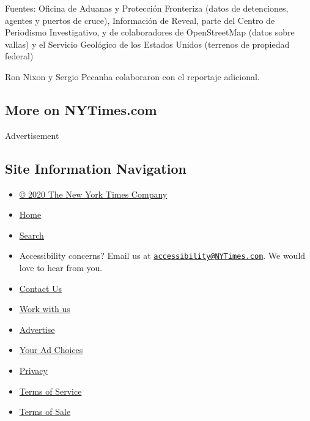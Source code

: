 Fuentes: Oficina de Aduanas y Protección Fronteriza (datos de
detenciones, agentes y puertos de cruce), Información de Reveal, parte
del Centro de Periodismo Investigativo, y de colaboradores de
OpenStreetMap (datos sobre vallas) y el Servicio Geológico de los
Estados Unidos (terrenos de propiedad federal)

Ron Nixon y Sergio Pecanha colaboraron con el reportaje adicional.

\hypertarget{more-on-nytimescom}{%
\subsection{More on NYTimes.com}\label{more-on-nytimescom}}

Advertisement

\hypertarget{site-information-navigation}{%
\subsection{Site Information
Navigation}\label{site-information-navigation}}

\begin{itemize}
\tightlist
\item
  \href{https://help.nytimes3xbfgragh.onion/hc/en-us/articles/115014792127-Copyright-notice}{©
  2020 The New York Times Company}
\item
  \href{https://www.nytimes3xbfgragh.onion}{Home}
\item
  \href{https://www.nytimes3xbfgragh.onion/search/}{Search}
\item
  Accessibility concerns? Email us at
  \href{mailto:accessibility@NYTimes.com}{\nolinkurl{accessibility@NYTimes.com}}.
  We would love to hear from you.
\item
  \href{https://help.nytimes3xbfgragh.onion/hc/en-us/articles/115015385887-Contact-Us}{Contact
  Us}
\item
  \href{https://www.nytco.com/careers/}{Work with us}
\item
  \href{https://nytmediakit.com/}{Advertise}
\item
  \href{https://help.nytimes3xbfgragh.onion/hc/en-us/articles/115014892108-Privacy-policy\#pp}{Your
  Ad Choices}
\item
  \href{https://help.nytimes3xbfgragh.onion/hc/en-us/articles/115014892108-Privacy-policy}{Privacy}
\item
  \href{https://help.nytimes3xbfgragh.onion/hc/en-us/articles/115014893428-Terms-of-service}{Terms
  of Service}
\item
  \href{https://help.nytimes3xbfgragh.onion/hc/en-us/articles/115014893968-Terms-of-sale}{Terms
  of Sale}
\end{itemize}


